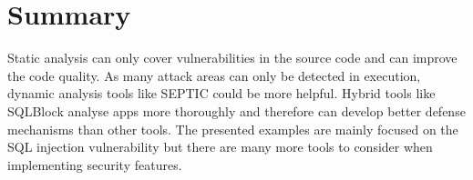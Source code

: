 \section{Summary}
Static analysis can only cover vulnerabilities in the source code and can improve the code quality. As many attack areas can only be detected in execution, dynamic analysis tools like SEPTIC could be more helpful. Hybrid tools like SQLBlock analyse apps more thoroughly and therefore can develop better defense mechanisms than other tools. The presented examples are mainly focused on the SQL injection vulnerability but there are many more tools to consider when implementing security features.






